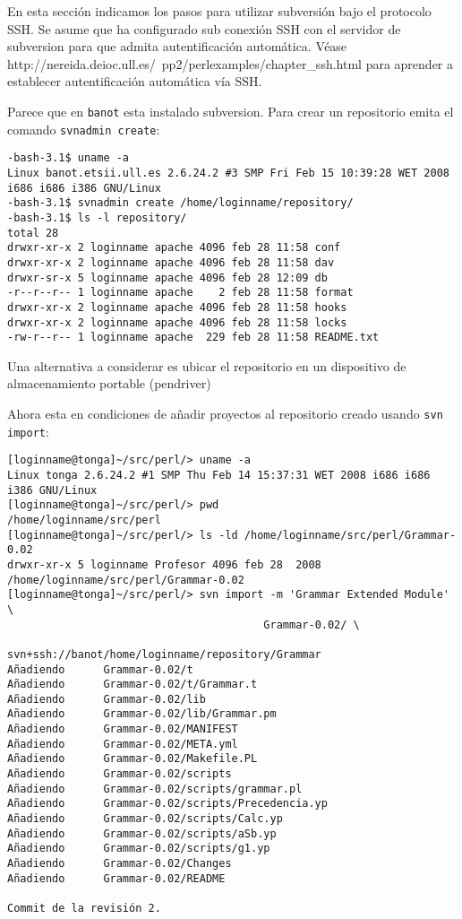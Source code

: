 En esta sección indicamos los pasos para utilizar subversión bajo el protocolo
SSH. Se asume que ha configurado sub conexión SSH con el servidor de subversion
para que admita autentificación automática.
Véase 
{
http://nereida.deioc.ull.es/~pp2/perlexamples/chapter_ssh.html
} para aprender a establecer autentificación automática vía SSH.

Parece que en \verb|banot| esta instalado subversion. 
Para crear un repositorio emita el comando \verb|svnadmin create|:

\begin{verbatim}
-bash-3.1$ uname -a
Linux banot.etsii.ull.es 2.6.24.2 #3 SMP Fri Feb 15 10:39:28 WET 2008 i686 i686 i386 GNU/Linux
-bash-3.1$ svnadmin create /home/loginname/repository/
-bash-3.1$ ls -l repository/
total 28
drwxr-xr-x 2 loginname apache 4096 feb 28 11:58 conf
drwxr-xr-x 2 loginname apache 4096 feb 28 11:58 dav
drwxr-sr-x 5 loginname apache 4096 feb 28 12:09 db
-r--r--r-- 1 loginname apache    2 feb 28 11:58 format
drwxr-xr-x 2 loginname apache 4096 feb 28 11:58 hooks
drwxr-xr-x 2 loginname apache 4096 feb 28 11:58 locks
-rw-r--r-- 1 loginname apache  229 feb 28 11:58 README.txt
\end{verbatim}

Una alternativa a considerar es ubicar el repositorio 
en un dispositivo de almacenamiento portable (pendriver)


Ahora esta en condiciones de añadir proyectos 
al repositorio creado usando \verb|svn import|:
\begin{verbatim}
[loginname@tonga]~/src/perl/> uname -a
Linux tonga 2.6.24.2 #1 SMP Thu Feb 14 15:37:31 WET 2008 i686 i686 i386 GNU/Linux
[loginname@tonga]~/src/perl/> pwd
/home/loginname/src/perl
[loginname@tonga]~/src/perl/> ls -ld /home/loginname/src/perl/Grammar-0.02
drwxr-xr-x 5 loginname Profesor 4096 feb 28  2008 /home/loginname/src/perl/Grammar-0.02
[loginname@tonga]~/src/perl/> svn import -m 'Grammar Extended Module' \
                                        Grammar-0.02/ \
                                        svn+ssh://banot/home/loginname/repository/Grammar
Añadiendo      Grammar-0.02/t
Añadiendo      Grammar-0.02/t/Grammar.t
Añadiendo      Grammar-0.02/lib
Añadiendo      Grammar-0.02/lib/Grammar.pm
Añadiendo      Grammar-0.02/MANIFEST
Añadiendo      Grammar-0.02/META.yml
Añadiendo      Grammar-0.02/Makefile.PL
Añadiendo      Grammar-0.02/scripts
Añadiendo      Grammar-0.02/scripts/grammar.pl
Añadiendo      Grammar-0.02/scripts/Precedencia.yp
Añadiendo      Grammar-0.02/scripts/Calc.yp
Añadiendo      Grammar-0.02/scripts/aSb.yp
Añadiendo      Grammar-0.02/scripts/g1.yp
Añadiendo      Grammar-0.02/Changes
Añadiendo      Grammar-0.02/README

Commit de la revisión 2.
\end{verbatim}

